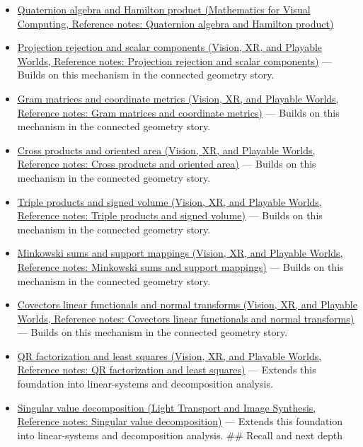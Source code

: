 \hypertarget{appendix-8bc4e8fc547c-used-by}{}

\begin{itemize}
\item
  \href{../02-Mathematics-for-Visual-Computing/main.pdf\#nameddest=appendix-965d9260eeab}{Quaternion algebra and Hamilton product (Mathematics for Visual Computing, Reference notes: Quaternion algebra and Hamilton product)}
\item
  \href{../07-Vision-XR-and-Playable-Worlds/main.pdf\#nameddest=appendix-505a502c372a}{Projection rejection and scalar components (Vision, XR, and Playable Worlds, Reference notes: Projection rejection and scalar components)} --- Builds on this mechanism in the connected geometry story.
\item
  \href{../07-Vision-XR-and-Playable-Worlds/main.pdf\#nameddest=appendix-3b863809f82a}{Gram matrices and coordinate metrics (Vision, XR, and Playable Worlds, Reference notes: Gram matrices and coordinate metrics)} --- Builds on this mechanism in the connected geometry story.
\item
  \href{../07-Vision-XR-and-Playable-Worlds/main.pdf\#nameddest=appendix-2391db8052b1}{Cross products and oriented area (Vision, XR, and Playable Worlds, Reference notes: Cross products and oriented area)} --- Builds on this mechanism in the connected geometry story.
\item
  \href{../07-Vision-XR-and-Playable-Worlds/main.pdf\#nameddest=appendix-5caa058bd9c7}{Triple products and signed volume (Vision, XR, and Playable Worlds, Reference notes: Triple products and signed volume)} --- Builds on this mechanism in the connected geometry story.
\item
  \href{../07-Vision-XR-and-Playable-Worlds/main.pdf\#nameddest=appendix-215ac7099a82}{Minkowski sums and support mappings (Vision, XR, and Playable Worlds, Reference notes: Minkowski sums and support mappings)} --- Builds on this mechanism in the connected geometry story.
\item
  \href{../07-Vision-XR-and-Playable-Worlds/main.pdf\#nameddest=appendix-46da295c6787}{Covectors linear functionals and normal transforms (Vision, XR, and Playable Worlds, Reference notes: Covectors linear functionals and normal transforms)} --- Builds on this mechanism in the connected geometry story.
\item
  \href{../07-Vision-XR-and-Playable-Worlds/main.pdf\#nameddest=appendix-c3421e6b4f2c}{QR factorization and least squares (Vision, XR, and Playable Worlds, Reference notes: QR factorization and least squares)} --- Extends this foundation into linear-systems and decomposition analysis.
\item
  \href{../04-Light-Transport-and-Image-Synthesis/main.pdf\#nameddest=appendix-1fad5e7f36fa}{Singular value decomposition (Light Transport and Image Synthesis, Reference notes: Singular value decomposition)} --- Extends this foundation into linear-systems and decomposition analysis. \#\# Recall and next depth
\end{itemize}

